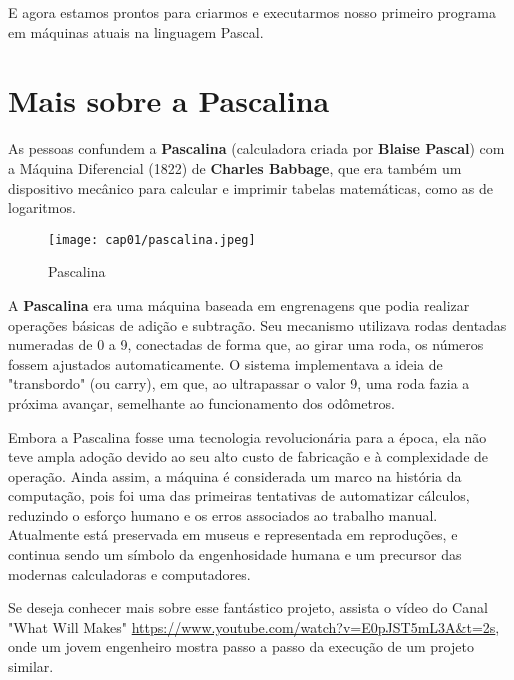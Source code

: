 E agora estamos prontos para criarmos e executarmos nosso primeiro programa em máquinas atuais na linguagem Pascal.

\section{Mais sobre a Pascalina}
As pessoas confundem a \textbf{Pascalina} (calculadora criada por \textbf{Blaise Pascal}) com a Máquina Diferencial (1822) de \textbf{Charles Babbage}, que era também um dispositivo mecânico para calcular e imprimir tabelas matemáticas, como as de logaritmos.

\begin{figure}[H]
	\centering
	\texttt{[image: cap01/pascalina.jpeg]}
	\caption{Pascalina}
\end{figure}

A \textbf{Pascalina} era uma máquina baseada em engrenagens que podia realizar operações básicas de adição e subtração. Seu mecanismo utilizava rodas dentadas numeradas de 0 a 9, conectadas de forma que, ao girar uma roda, os números fossem ajustados automaticamente. O sistema implementava a ideia de "transbordo" (ou carry), em que, ao ultrapassar o valor 9, uma roda fazia a próxima avançar, semelhante ao funcionamento dos odômetros. 

Embora a Pascalina fosse uma tecnologia revolucionária para a época, ela não teve ampla adoção devido ao seu alto custo de fabricação e à complexidade de operação. Ainda assim, a máquina é considerada um marco na história da computação, pois foi uma das primeiras tentativas de automatizar cálculos, reduzindo o esforço humano e os erros associados ao trabalho manual. Atualmente está preservada em museus e representada em reproduções, e continua sendo um símbolo da engenhosidade humana e um precursor das modernas calculadoras e computadores.

Se deseja conhecer mais sobre esse fantástico projeto, assista o vídeo do Canal "What Will Makes" \url{https://www.youtube.com/watch?v=E0pJST5mL3A&t=2s}, onde um jovem engenheiro mostra passo a passo da execução de um projeto similar.

\clearpage